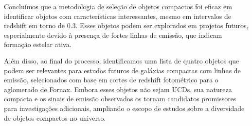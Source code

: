 Concluímos que a metodologia de seleção de objetos compactos foi eficaz em identificar objetos com características interessantes, mesmo em intervalos de redshift em torno de 0.3. Esses objetos podem ser explorados em projetos futuros, especialmente devido à presença de fortes linhas de emissão, que indicam formação estelar ativa.

Além disso, ao final do processo, identificamos uma lista de quatro objetos que podem ser relevantes para estudos futuros de galáxias compactas com linhas de emissão, selecionados com base em cortes de redshift fotométrico para o aglomerado de Fornax. Embora esses objetos não sejam UCDs, sua natureza compacta e os sinais de emissão observados os tornam candidatos promissores para investigações adicionais, ampliando o escopo de estudos sobre a diversidade de objetos compactos no universo.

